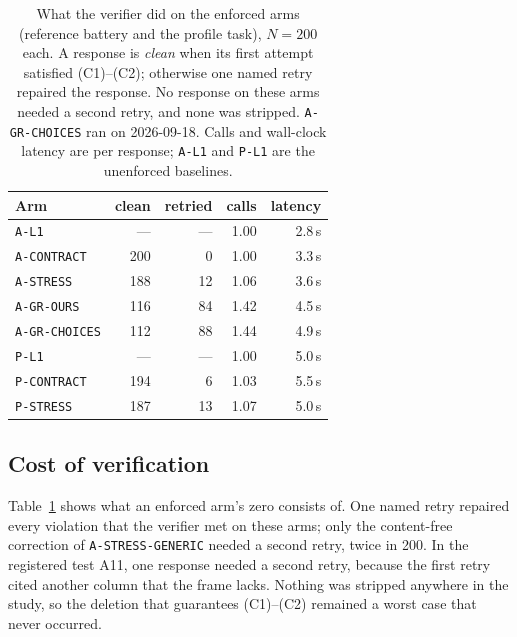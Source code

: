 \documentclass[10pt,twocolumn]{article}
\begin{document}
\begin{table}[!htbp]
\caption{What the verifier did on the enforced arms (reference battery and
the profile task), $N=200$ each. A response is \emph{clean} when its first
attempt satisfied (C1)--(C2); otherwise one named retry repaired the
response. No
response on these arms needed a second retry, and none was stripped.
\texttt{A-GR-CHOICES} ran on 2026-09-18. Calls and wall-clock
latency are per response; \texttt{A-L1} and \texttt{P-L1} are the unenforced
baselines.}
\label{tab:retry}
\centering
\footnotesize
\setlength{\tabcolsep}{4pt}
\begin{tabular}{@{}lrrrr@{}}
\toprule
Arm & clean & retried & calls & latency \\
\midrule
\texttt{A-L1}         & ---  & ---  & 1.00 & 2.8\,s \\
\texttt{A-CONTRACT}   & 200  &   0  & 1.00 & 3.3\,s \\
\texttt{A-STRESS}     & 188  &  12  & 1.06 & 3.6\,s \\
\texttt{A-GR-OURS}    & 116  &  84  & 1.42 & 4.5\,s \\
\texttt{A-GR-CHOICES} & 112  &  88  & 1.44 & 4.9\,s \\
\midrule
\texttt{P-L1}         & ---  & ---  & 1.00 & 5.0\,s \\
\texttt{P-CONTRACT}   & 194  &   6  & 1.03 & 5.5\,s \\
\texttt{P-STRESS}     & 187  &  13  & 1.07 & 5.0\,s \\
\bottomrule
\end{tabular}
\end{table}

\subsection{Cost of verification}

Table~\ref{tab:retry} shows what an enforced arm's zero consists of. One named
retry repaired every violation that the verifier met on these arms; only the
content-free correction of \texttt{A-STRESS-GENERIC} needed a second retry,
twice in 200. In the registered test A11, one response needed a second retry,
because the first retry cited another column that the frame lacks. Nothing was stripped anywhere in the study, so the deletion that
guarantees (C1)--(C2) remained a worst case that never occurred.
\end{document}
